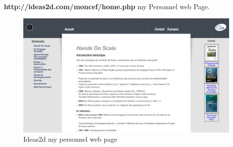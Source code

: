 \newpage
\textbf{http://ideas2d.com/moncef/home.php} my Personnel web Page.
\begin{figure}[H]
        \centering
                \centering
                \includegraphics[width=\textwidth]{idea2d.png}
               \caption{Ideas2d my personnel web page}

\end{figure}